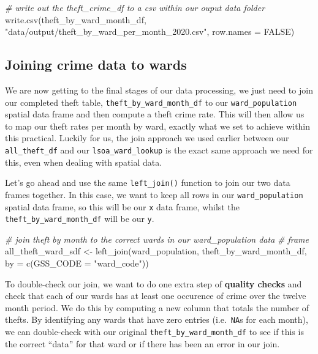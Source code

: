 \documentclass[
]{book}
\newenvironment{Shaded}{\begin{snugshade}}{\end{snugshade}}
\newcommand{\AttributeTok}[1]{\textcolor[rgb]{0.77,0.63,0.00}{#1}}
\newcommand{\CommentTok}[1]{\textcolor[rgb]{0.56,0.35,0.01}{\textit{#1}}}
\newcommand{\ConstantTok}[1]{\textcolor[rgb]{0.00,0.00,0.00}{#1}}
\newcommand{\FunctionTok}[1]{\textcolor[rgb]{0.00,0.00,0.00}{#1}}
\newcommand{\NormalTok}[1]{#1}
\newcommand{\OtherTok}[1]{\textcolor[rgb]{0.56,0.35,0.01}{#1}}
\newcommand{\StringTok}[1]{\textcolor[rgb]{0.31,0.60,0.02}{#1}}
\begin{document}
\begin{Shaded}
\begin{Highlighting}[]
\CommentTok{\# write out the theft\_crime\_df to a csv within our ouput data folder}
\FunctionTok{write.csv}\NormalTok{(theft\_by\_ward\_month\_df, }\StringTok{"data/output/theft\_by\_ward\_per\_month\_2020.csv"}\NormalTok{,}
    \AttributeTok{row.names =} \ConstantTok{FALSE}\NormalTok{)}
\end{Highlighting}
\end{Shaded}

\hypertarget{joining-crime-data-to-wards}{%
\subsection{Joining crime data to wards}\label{joining-crime-data-to-wards}}

We are now getting to the final stages of our data processing, we just need to join our completed theft table, \texttt{theft\_by\_ward\_month\_df} to our \texttt{ward\_population} spatial data frame and then compute a theft crime rate. This will then allow us to map our theft rates per month by ward, exactly what we set to achieve within this practical. Luckily for us, the join approach we used earlier between our \texttt{all\_theft\_df} and our \texttt{lsoa\_ward\_lookup} is the exact same approach we need for this, even when dealing with spatial data.

Let's go ahead and use the same \texttt{left\_join()} function to join our two data frames together. In this case, we want to keep all rows in our \texttt{ward\_population} spatial data frame, so this will be our \texttt{x} data frame, whilst the \texttt{theft\_by\_ward\_month\_df} will be our \texttt{y}.

\begin{Shaded}
\begin{Highlighting}[]
\CommentTok{\# join theft by month to the correct wards in our ward\_population data}
\CommentTok{\# frame}
\NormalTok{all\_theft\_ward\_sdf }\OtherTok{\textless{}{-}} \FunctionTok{left\_join}\NormalTok{(ward\_population, theft\_by\_ward\_month\_df, }\AttributeTok{by =} \FunctionTok{c}\NormalTok{(}\AttributeTok{GSS\_CODE =} \StringTok{"ward\_code"}\NormalTok{))}
\end{Highlighting}
\end{Shaded}

To double-check our join, we want to do one extra step of \textbf{quality checks} and check that each of our wards has at least one occurence of crime over the twelve month period. We do this by computing a new column that totals the number of thefts. By identifying any wards that have zero entries (i.e.~\texttt{NA}s for each month), we can double-check with our original \texttt{theft\_by\_ward\_month\_df} to see if this is the correct ``data'' for that ward or if there has been an error in our join.
\end{document}

